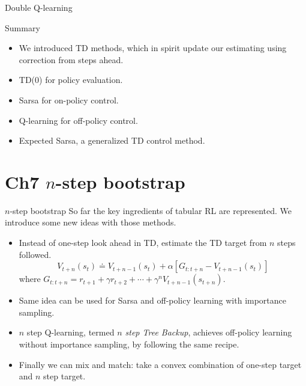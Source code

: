 \documentclass[handout]{beamer}
\begin{document}
\begin{frame}{Double Q-learning}
\small
\begin{algorithm}[H]
	\caption{Q-learning for estimating $Q^{\pi}$}	
\end{algorithm}
\end{frame}

\begin{frame}{Summary}
\begin{itemize}
	\item We introduced TD methods, which in spirit update our estimating using correction from steps ahead. 
	\item TD(0) for policy evaluation.
	\item Sarsa for on-policy control.
	\item Q-learning for off-policy control.
	\item Expected Sarsa, a generalized TD control method.
\end{itemize}
\end{frame}

\section{Ch7 $n$-step bootstrap}
\begin{frame}{$n$-step bootstrap}
\small
So far the key ingredients of tabular RL are represented. We introduce some new ideas with those methods. 

\begin{itemize}[<+(1)->]
	\item Instead of one-step look ahead in TD, estimate the TD target from $n$ steps followed. $$ V_{t+n}(s_t) \doteq V_{t+n-1}(s_t) + \alpha [G_{t:t+n} - V_{t+n-1}(s_t)]$$ where $G_{t:t+n} = r_{t+1}+\gamma r_{t+2} + \cdots + \gamma^n V_{t+n-1}(s_{t+n})$. 
	\item Same idea can be used for Sarsa and off-policy learning with importance sampling.
	\item $n$ step Q-learning, termed \textit{$n$ step Tree Backup}, achieves off-policy learning without importance sampling, by following the same recipe.
	\item Finally we can mix and match: take a convex combination of one-step target and $n$ step target.
\end{itemize}
\end{frame}
\end{document}
